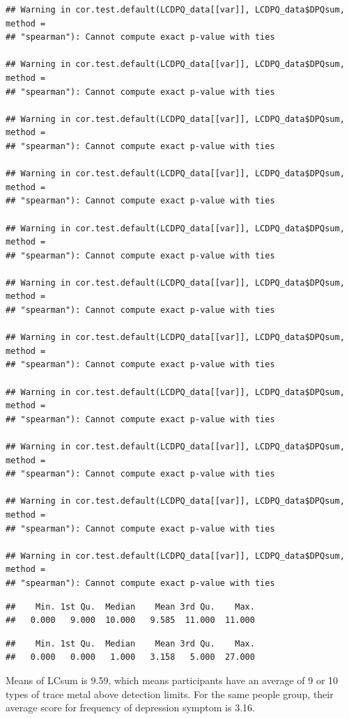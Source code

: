 \documentclass[
  man]{apa6}
\begin{document}
\begin{verbatim}
## Warning in cor.test.default(LCDPQ_data[[var]], LCDPQ_data$DPQsum, method =
## "spearman"): Cannot compute exact p-value with ties

## Warning in cor.test.default(LCDPQ_data[[var]], LCDPQ_data$DPQsum, method =
## "spearman"): Cannot compute exact p-value with ties

## Warning in cor.test.default(LCDPQ_data[[var]], LCDPQ_data$DPQsum, method =
## "spearman"): Cannot compute exact p-value with ties

## Warning in cor.test.default(LCDPQ_data[[var]], LCDPQ_data$DPQsum, method =
## "spearman"): Cannot compute exact p-value with ties

## Warning in cor.test.default(LCDPQ_data[[var]], LCDPQ_data$DPQsum, method =
## "spearman"): Cannot compute exact p-value with ties

## Warning in cor.test.default(LCDPQ_data[[var]], LCDPQ_data$DPQsum, method =
## "spearman"): Cannot compute exact p-value with ties

## Warning in cor.test.default(LCDPQ_data[[var]], LCDPQ_data$DPQsum, method =
## "spearman"): Cannot compute exact p-value with ties

## Warning in cor.test.default(LCDPQ_data[[var]], LCDPQ_data$DPQsum, method =
## "spearman"): Cannot compute exact p-value with ties

## Warning in cor.test.default(LCDPQ_data[[var]], LCDPQ_data$DPQsum, method =
## "spearman"): Cannot compute exact p-value with ties

## Warning in cor.test.default(LCDPQ_data[[var]], LCDPQ_data$DPQsum, method =
## "spearman"): Cannot compute exact p-value with ties

## Warning in cor.test.default(LCDPQ_data[[var]], LCDPQ_data$DPQsum, method =
## "spearman"): Cannot compute exact p-value with ties
\end{verbatim}

\begin{verbatim}
##    Min. 1st Qu.  Median    Mean 3rd Qu.    Max. 
##   0.000   9.000  10.000   9.585  11.000  11.000
\end{verbatim}

\begin{verbatim}
##    Min. 1st Qu.  Median    Mean 3rd Qu.    Max. 
##   0.000   0.000   1.000   3.158   5.000  27.000
\end{verbatim}

Means of LCsum is 9.59, which means participants have an average of 9 or 10 types of trace metal above detection limits. For the same people group, their average score for frequency of depression symptom is 3.16.
\end{document}
